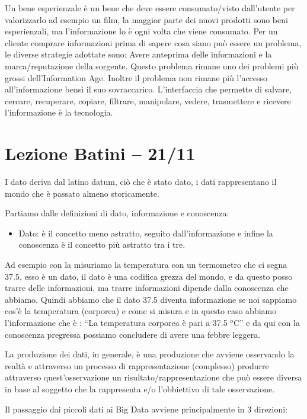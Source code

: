 \documentclass[]{article}
\begin{document}
Un bene esperienzale è un bene che deve essere consumato/visto
dall'utente per valorizzarlo ad esempio un film, la maggior parte dei
nuovi prodotti sono beni esperienzali, ma l'informazione lo è ogni volta
che viene consumato. Per un cliente comprare informazioni prima di
sapere cosa siano può essere un problema, le diverse strategie adottate
sono: Avere anteprima delle informazioni e la marca/reputazione della
sorgente. Questo problema rimane uno dei problemi più grossi
dell'Information Age. Inoltre il problema non rimane più l'accesso
all'informazione bensì il suo sovraccarico. L'interfaccia che permette
di salvare, cercare, recuperare, copiare, filtrare, manipolare, vedere,
trasmettere e ricevere l'informazione è la tecnologia.
\section*{Lezione Batini -- 21/11}

I dato deriva dal latino datum, ciò che è stato dato, i dati
rappresentano il mondo che è passato almeno storicamente.

Partiamo dalle definizioni di dato, informazione e conoscenza:

\begin{itemize}
	 
	\item
	Dato: è il concetto meno astratto, seguito dall'informazione e infine
	la conoscenza è il concetto più astratto tra i tre. 
\end{itemize}

Ad esempio con la misuriamo la temperatura con un termometro che ci
segna 37.5, esso è un dato, il dato è una codifica grezza del mondo, e
da questo posso trarre delle informazioni, ma trarre informazioni
dipende dalla conoscenza che abbiamo. Quindi abbiamo che il dato 37.5
diventa informazione se noi sappiamo cos'è la temperatura (corporea) e
come si misura e in questo caso abbiamo l'informazione che è : ``La
temperatura corporea è pari a 37.5 $^o$C'' e da qui con la conoscenza
pregressa possiamo concludere di avere una febbre leggera.

La produzione dei dati, in generale, è una produzione che avviene
osservando la realtà e attraverso un processo di rappresentazione
(complesso) produrre attraverso quest'osservazione un
risultato/rappresentazione che può essere diversa in base al soggetto
che la rappresenta e/o l'obbiettivo di tale osservazione.

Il passaggio dai piccoli dati ai Big Data avviene principalmente in 3
direzioni:
\end{document}

